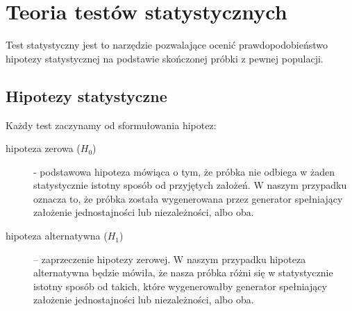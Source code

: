\section{Teoria testów statystycznych}
Test statystyczny jest to narzędzie pozwalające ocenić prawdopodobieństwo hipotezy statystycznej na podstawie skończonej próbki z pewnej populacji.
\subsection{Hipotezy statystyczne}
Każdy test zaczynamy od sformułowania hipotez:
\begin{description}
\item[hipoteza zerowa ($H_0$)] - podstawowa hipoteza mówiąca o tym, że próbka nie odbiega w żaden statystycznie istotny sposób od przyjętych założeń. W naszym przypadku oznacza to, że próbka została wygenerowana przez generator spełniający założenie jednostajności lub niezależności, albo oba.
\item[hipoteza alternatywna ($H_1$)] – zaprzeczenie hipotezy zerowej. W naszym przypadku hipoteza alternatywna będzie mówiła, że nasza próbka różni się w statystycznie istotny sposób od takich, które wygenerowałby generator spełniający założenie jednostajności lub niezależności, albo oba.
\end{description}


